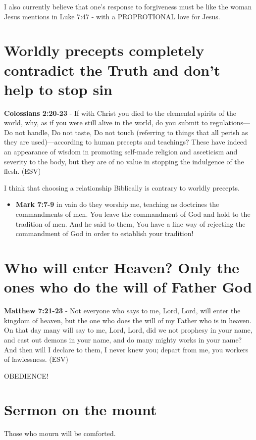 \documentclass[11pt]{article}
\begin{document}
I also currently believe that one's response to forgiveness must be like the woman Jesus mentions in Luke 7:47 - with a PROPROTIONAL love for Jesus.

\section{Worldly precepts completely contradict the Truth and don't help to stop sin}
\label{sec:org0ec7ec7}
\textbf{Colossians 2:20-23} - If with Christ you died to the elemental spirits of the world, why, as if you were still alive in the world, do you submit to regulations— Do not handle, Do not taste, Do not touch (referring to things that all perish as they are used)—according to human precepts and teachings? These have indeed an appearance of wisdom in promoting self-made religion and asceticism and severity to the body, but they are of no value in stopping the indulgence of the flesh. (ESV)

I think that choosing a relationship Biblically is contrary to worldly precepts.

\begin{itemize}
\item \textbf{Mark 7:7-9} in vain do they worship me, teaching as doctrines the commandments of men.  You leave the commandment of God and hold to the tradition of men.  And he said to them, You have a fine way of rejecting the commandment of God in order to establish your tradition!
\end{itemize}

\section{Who will enter Heaven? Only the ones who do the will of Father God}
\label{sec:orgcdb320c}
\textbf{Matthew 7:21-23} - Not everyone who says to me, Lord, Lord, will enter the kingdom of heaven, but the one who does the will of my Father who is in heaven. On that day many will say to me, Lord, Lord, did we not prophesy in your name, and cast out demons in your name, and do many mighty works in your name? And then will I declare to them, I never knew you; depart from me, you workers of lawlessness. (ESV)

OBEDIENCE!

\section{Sermon on the mount}
\label{sec:org94773dd}
Those who mourn will be comforted.
\end{document}
